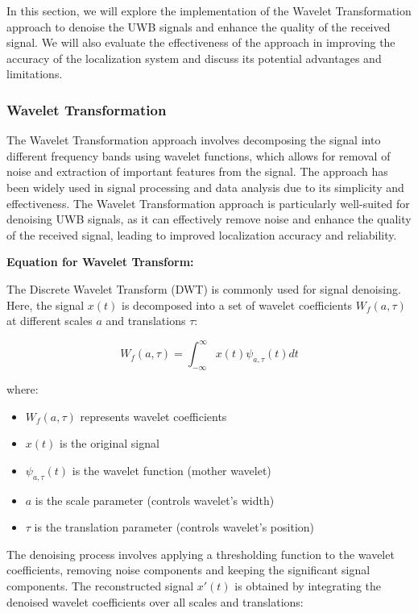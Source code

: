 In this section, we will explore the implementation of the Wavelet Transformation approach to denoise the UWB signals and enhance the quality of the received signal. We will also evaluate the effectiveness of the approach in improving the accuracy of the localization system and discuss its potential advantages and limitations.

\subsubsection{Wavelet Transformation}\label{wavelet_transformation}

The Wavelet Transformation approach involves decomposing the signal into different frequency bands using wavelet functions, which allows for removal of noise and extraction of important features from the signal. The approach has been widely used in signal processing and data analysis due to its simplicity and effectiveness. The Wavelet Transformation approach is particularly well-suited for denoising UWB signals, as it can effectively remove noise and enhance the quality of the received signal, leading to improved localization accuracy and reliability.

\textbf{Equation for Wavelet Transform:}

The Discrete Wavelet Transform (DWT) is commonly used for signal denoising. Here, the signal $x(t)$ is decomposed into a set of wavelet coefficients $W_f(a, \tau)$ at different scales $a$ and translations $\tau$:

\begin{equation}
W_f(a, \tau) = \int_{-\infty}^{\infty} x(t) \psi_{a, \tau}(t) dt
\end{equation}

where:

\begin{itemize}
  \item $W_f(a, \tau)$ represents wavelet coefficients
  \item $x(t)$ is the original signal
  \item $\psi_{a, \tau}(t)$ is the wavelet function (mother wavelet)
  \item $a$ is the scale parameter (controls wavelet's width)
  \item $\tau$ is the translation parameter (controls wavelet's position)
\end{itemize}

The denoising process involves applying a thresholding function to the wavelet coefficients, removing noise components and keeping the significant signal components. The reconstructed signal $x'(t)$ is obtained by integrating the denoised wavelet coefficients over all scales and translations:

